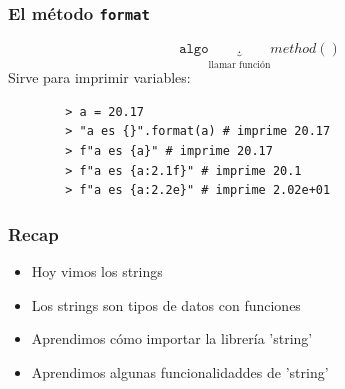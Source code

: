 \documentclass[14pt,aspectratio=169,xcolor=dvipsnames]{beamer}
\begin{document}
\begin{frame}[fragile]\frametitle{El método \texttt{format}}
    $$  \texttt{algo}\underbrace{.}_\text{llamar función}method() $$
Sirve para imprimir variables:
    \begin{verbatim}
        > a = 20.17
        > "a es {}".format(a) # imprime 20.17
        > f"a es {a}" # imprime 20.17
        > f"a es {a:2.1f}" # imprime 20.1
        > f"a es {a:2.2e}" # imprime 2.02e+01
    \end{verbatim}
\end{frame}
\begin{frame}\frametitle{Recap}
    \begin{itemize}
        \item Hoy vimos los strings
        \item Los strings son tipos de datos con funciones
        \item Aprendimos cómo importar la librería 'string'
        \item Aprendimos algunas funcionalidaddes de 'string'
    \end{itemize}
\end{frame}
\begin{frame}
    \maketitle
\end{frame}
\end{document}
